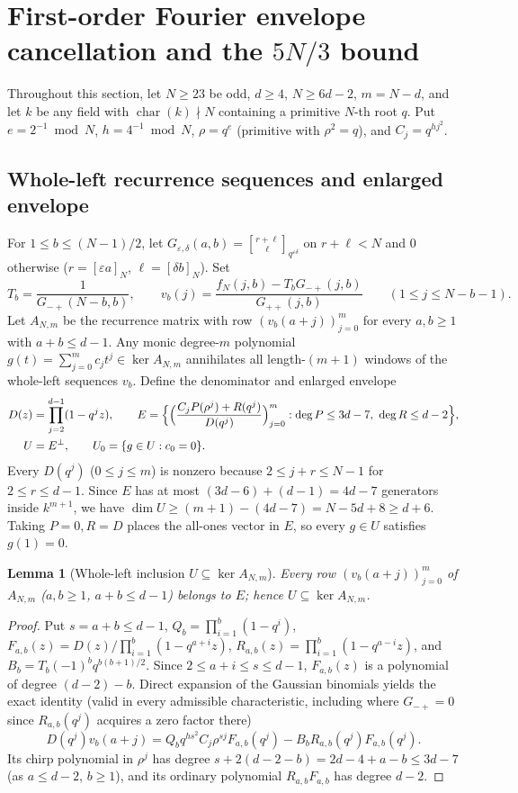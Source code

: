 \documentclass[11pt,reqno]{amsart}
\numberwithin{equation}{section}
\newtheorem{lemma}[theorem]{Lemma}
\theoremstyle{definition}
\theoremstyle{remark}
\newcommand{\gb}[3]{\genfrac{[}{]}{0pt}{}{#1}{#2}_{#3}}
\newcommand{\eps}{\varepsilon}
\begin{document}
\section{First-order Fourier envelope cancellation and the $5N/3$ bound}
\label{sec:five-thirds}

Throughout this section, let $N\ge 23$ be odd, $d\ge 4$, $N\ge 6d-2$, $m=N-d$, and let $k$ be any field with $\operatorname{char}(k)\nmid N$ containing a primitive $N$-th root $q$. Put $e=2^{-1}\bmod N$, $h=4^{-1}\bmod N$, $\rho=q^e$ (primitive with $\rho^2=q$), and $C_j=q^{hj^2}$.

\subsection{Whole-left recurrence sequences and enlarged envelope}

For $1\le b\le (N-1)/2$, let $G_{\eps,\delta}(a,b)=\gb{r+\ell}{\ell}{q^{\eps\delta}}$ on $r+\ell<N$ and $0$ otherwise ($r=[\eps a]_N$, $\ell=[\delta b]_N$). Set
\[
T_b = \frac{1}{G_{-+}(N-b,b)},\qquad
v_b(j) = \frac{f_N(j,b) - T_b G_{-+}(j,b)}{G_{++}(j,b)}\qquad (1\le j\le N-b-1).
\]
Let $A_{N,m}$ be the recurrence matrix with row $(v_b(a+j))_{j=0}^m$ for every $a,b\ge 1$ with $a+b\le d-1$. Any monic degree-$m$ polynomial $g(t)=\sum_{j=0}^m c_j t^j\in\ker A_{N,m}$ annihilates all length-$(m+1)$ windows of the whole-left sequences $v_b$. Define the denominator and enlarged envelope
\begin{align}
D(z) &= \prod_{j=2}^{d-1}(1 - q^j z), \qquad
E = \Bigl\{\Bigl(\frac{C_j P(\rho^j) + R(q^j)}{D(q^j)}\Bigr)_{j=0}^m : \deg P\le 3d-7,\ \deg R\le d-2\Bigr\}, \label{eq:envelope}\\
U &= E^\perp,\qquad U_0 = \{g\in U : c_0=0\}. \nonumber
\end{align}
Every $D(q^j)$ ($0\le j\le m$) is nonzero because $2\le j+r\le N-1$ for $2\le r\le d-1$. Since $E$ has at most $(3d-6)+(d-1)=4d-7$ generators inside $k^{m+1}$, we have $\dim U \ge (m+1)-(4d-7) = N-5d+8 \ge d+6$. Taking $P=0, R=D$ places the all-ones vector in $E$, so every $g\in U$ satisfies $g(1)=0$.

\begin{lemma}[Whole-left inclusion $U\subseteq\ker A_{N,m}$]
\label{lem:envelope-inclusion}
Every row $(v_b(a+j))_{j=0}^m$ of $A_{N,m}$ ($a,b\ge 1$, $a+b\le d-1$) belongs to $E$; hence $U\subseteq\ker A_{N,m}$.
\end{lemma}

\begin{proof}
Put $s=a+b\le d-1$, $Q_b=\prod_{i=1}^b(1-q^i)$, $F_{a,b}(z)=D(z)/\prod_{i=1}^b(1-q^{a+i}z)$, $R_{a,b}(z)=\prod_{i=1}^b(1-q^{a-i}z)$, and $B_b=T_b(-1)^b q^{b(b+1)/2}$. Since $2\le a+i\le s\le d-1$, $F_{a,b}(z)$ is a polynomial of degree $(d-2)-b$. Direct expansion of the Gaussian binomials yields the exact identity (valid in every admissible characteristic, including where $G_{-+}=0$ since $R_{a,b}(q^j)$ acquires a zero factor there)
\[
D(q^j)v_b(a+j) = Q_b q^{hs^2} C_j \rho^{sj} F_{a,b}(q^j) - B_b R_{a,b}(q^j) F_{a,b}(q^j).
\]
Its chirp polynomial in $\rho^j$ has degree $s+2(d-2-b)=2d-4+a-b\le 3d-7$ (as $a\le d-2$, $b\ge 1$), and its ordinary polynomial $R_{a,b}F_{a,b}$ has degree $d-2$.
\end{proof}
\end{document}
